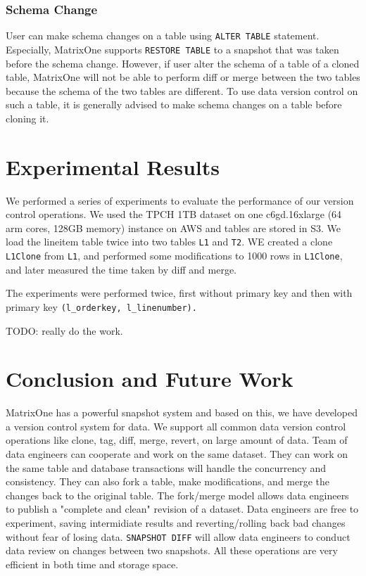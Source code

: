 \documentclass[sigconf,nonacm]{acmart} %
\begin{document}
\subsubsection{Schema Change}
User can make schema changes on a table using \texttt{ALTER TABLE} 
statement.  Especially, MatrixOne supports \texttt{RESTORE TABLE} 
to a snapshot that was taken before the schema change.  However, 
if user alter the schema of a table of a cloned table, MatrixOne
will not be able to perform diff or merge between the two tables
because the schema of the two tables are different.  To use data
version control on such a table, it is generally advised to make 
schema changes on a table before cloning it. 


\section{Experimental Results}
We performed a series of experiments to evaluate the performance of 
our version control operations.  We used the TPCH 1TB dataset on one 
c6gd.16xlarge (64 arm cores, 128GB memory) instance on AWS and tables 
are stored in S3.  We load the lineitem table twice into two tables 
\texttt{L1} and \texttt{T2}.  WE created a clone \texttt{L1Clone} 
from \texttt{L1}, and performed some modifications to 1000 rows in 
\texttt{L1Clone}, and later measured the time taken by diff and merge.

The experiments were performed twice, first without primary key and
then with primary key \texttt{(l\_orderkey, l\_linenumber).}

TODO: really do the work.

\section{Conclusion and Future Work}
MatrixOne has a powerful snapshot system and based on this, we have 
developed a version control system for data.  We support all common
data version control operations like clone, tag, diff, merge, 
revert, on large amount of data.  Team of data engineers can cooperate 
and work on the same dataset.  They can work on the same table and
database transactions will handle the concurrency and consistency.
They can also fork a table, make modifications, and merge the changes 
back to the original table.   The fork/merge model allows data
engineers to publish a "complete and clean" revision of a dataset.
Data engineers are free to experiment, saving intermidiate results
and reverting/rolling back bad changes without fear of losing data.
\texttt{SNAPSHOT DIFF} will allow data engineers to conduct 
data review on changes between two snapshots.  All these operations
are very efficient in both time and storage space.
\end{document}

